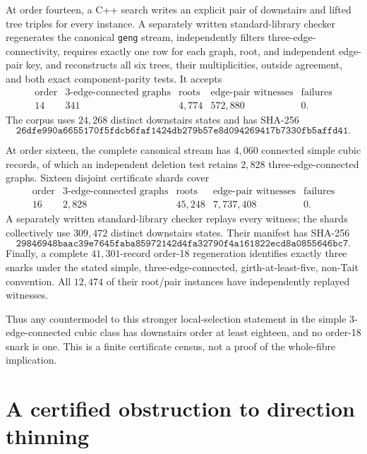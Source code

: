 \documentclass[11pt]{article}
\theoremstyle{definition}
\theoremstyle{remark}
\newcommand{\1}{\mathbf 1}
\begin{document}
At order fourteen, a C++ search writes an explicit pair of downstairs and
lifted tree triples for every instance.  A separately written
standard-library checker regenerates the canonical \texttt{geng} stream,
independently filters three-edge-connectivity, requires exactly one row for
each graph, root, and independent edge-pair key, and reconstructs all six trees,
their multiplicities, outside agreement, and both exact component-parity
tests.  It accepts
\[
\begin{array}{c|rrrr}
\text{order}&\text{3-edge-connected graphs}&\text{roots}
 &\text{edge-pair witnesses}&\text{failures}\\ \hline
14&341&4{,}774&572{,}880&0.
\end{array}
\]
The corpus uses \(24{,}268\) distinct downstairs states and has SHA-256
\[
\texttt{26dfe990a6655170f5fdcb6faf1424db279b57e8d094269417b7330fb5affd41}.
\]

At order sixteen, the complete canonical stream has \(4{,}060\) connected
simple cubic records, of which an independent deletion test retains
\(2{,}828\) three-edge-connected graphs.  Sixteen disjoint certificate
shards cover
\[
\begin{array}{c|rrrr}
\text{order}&\text{3-edge-connected graphs}&\text{roots}
 &\text{edge-pair witnesses}&\text{failures}\\ \hline
16&2{,}828&45{,}248&7{,}737{,}408&0.
\end{array}
\]
A separately written standard-library checker replays every witness; the
shards collectively use \(309{,}472\) distinct downstairs states.  Their
manifest has SHA-256
\[
\texttt{29846948baac39e7645faba85972142d4fa32790f4a161822ecd8a0855646bc7}.
\]
Finally, a complete \(41{,}301\)-record order-18 regeneration identifies
exactly three snarks under the stated simple, three-edge-connected,
girth-at-least-five, non-Tait convention.  All \(12{,}474\) of their
root/pair instances have independently replayed witnesses.

Thus any countermodel to this stronger local-selection statement in the
simple 3-edge-connected cubic class has downstairs order at least eighteen,
and no order-18 snark is one.  This is a finite certificate census, not a
proof of the whole-fibre implication.

\section{A certified obstruction to direction thinning}
\end{document}

